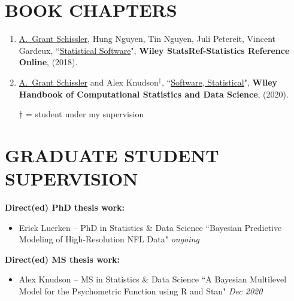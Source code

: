 \documentclass[paper=a4,fontsize=11pt]{scrartcl} %
\newcommand{\NewPart}[2]{\section*{\uppercase{#1} #2 }}
\newcommand{\PaperEntry}[7]{
		\noindent #1, ``\href{#7}{#2}", \textit{#3} \textbf{#4}, #5 (#6).}
\newcommand{\ThesisEntry}[5]{
		\noindent #1 -- #2 #3 ``#4" \textit{#5}}
\begin{document}
\NewPart{Book chapters}{}
\vspace{-7pt}
\begin{enumerate}


 \item \PaperEntry{\underline{A.~Grant Schissler}, Hung Nguyen, Tin Nguyen, Juli Petereit, Vincent Gardeux}{Statistical Software}{}{Wiley StatsRef-Statistics Reference Online}{}{2018}{}

\item \PaperEntry{\underline{A.~Grant Schissler} and Alex Knudson$^{\dagger}$}{Software, Statistical}{}{Wiley Handbook of Computational Statistics and Data Science}{}{2020}{}

  $\dagger$ = student under my supervision
   
\end{enumerate}



\NewPart{Graduate student supervision}{}
\vspace{7pt}


\noindent \textbf{Direct(ed) PhD thesis work:}

\begin{itemize}[noitemsep]

  \item \ThesisEntry{Erick Luerken}{PhD in Statistics \& Data Science}{}{Bayesian Predictive Modeling of High-Resolution NFL Data}{ongoing}

  \end{itemize}

\noindent \textbf{Direct(ed) MS thesis work:}

\begin{itemize}[noitemsep]

  \item \ThesisEntry{Alex Knudson}{MS in Statistics \& Data Science}{}{A Bayesian Multilevel Model for the Psychometric Function using R and Stan}{Dec 2020}

  \end{itemize}
\end{document}

